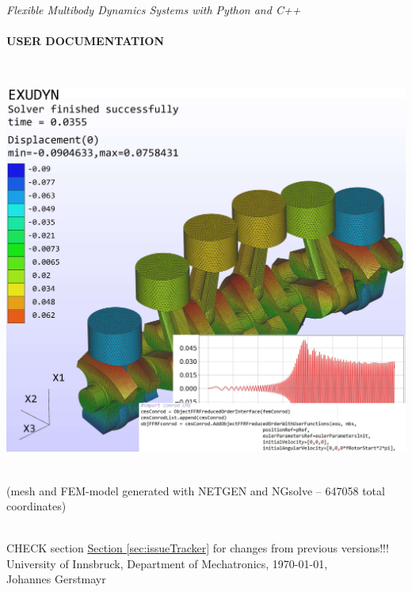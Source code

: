 \documentclass[11pt,a4paper]{book}
\newcommand{\refSection}[1]{\hyperref[#1]{\underline{Section \ref*{#1}}}} %
\begin{document}
\setcounter{page}{0}
\pagestyle{empty}

\begin{center}
{\Large {\it Flexible Multibody Dynamics Systems with Python and C++}}\vspace{1cm}\\
{\Huge {\bf \codeName}} \vspace{0.5cm}\\
{\Large \bf USER DOCUMENTATION} \vspace{1cm}\\
\vspace{0.2cm}
\begin{center}
	\includegraphics[height=14cm]{intro2.jpg}\\
	{\tiny (mesh and FEM-model generated with NETGEN and NGsolve -- 647058 total coordinates)}
\end{center}
\vspace{0.2cm}
{\small }\\
{\small CHECK section \refSection{sec:issueTracker} for changes from previous versions!!!\\}
\vspace{1.5cm}
University of Innsbruck, Department of Mechatronics, \today,\vspace{0.25cm}\\
Johannes Gerstmayr\vspace{2cm}
\end{center}
\end{document}
